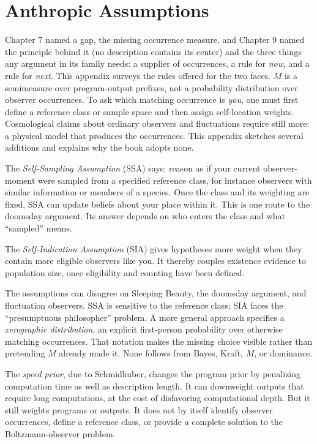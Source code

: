 \chapter{Anthropic Assumptions}\label{app:anthropics}

Chapter 7 named a gap, the missing occurrence measure, and Chapter 9 named the principle behind it (no description contains its center) and the three things any argument in its family needs: a supplier of occurrences, a rule for \emph{now}, and a rule for \emph{next}. This appendix surveys the rules offered for the two faces. $M$ is a semimeasure over program-output prefixes, not a probability distribution over observer occurrences. To ask which matching occurrence is \emph{you}, one must first define a reference class or sample space and then assign self-location weights. Cosmological claims about ordinary observers and fluctuations require still more: a physical model that produces the occurrences. This appendix sketches several additions and explains why the book adopts none.

The \emph{Self-Sampling Assumption} (SSA) says: reason as if your current observer-moment were sampled from a specified reference class, for instance observers with similar information or members of a species. Once the class and its weighting are fixed, SSA can update beliefs about your place within it. This is one route to the doomsday argument. Its answer depends on who enters the class and what ``sampled'' means.

The \emph{Self-Indication Assumption} (SIA) gives hypotheses more weight when they contain more eligible observers like you. It thereby couples existence evidence to population size, once eligibility and counting have been defined.

The assumptions can disagree on Sleeping Beauty, the doomsday argument, and fluctuation observers. SSA is sensitive to the reference class; SIA faces the ``presumptuous philosopher'' problem. A more general approach specifies a \emph{xerographic distribution}, an explicit first-person probability over otherwise matching occurrences. That notation makes the missing choice visible rather than pretending $M$ already made it. None follows from Bayes, Kraft, $M$, or dominance.

The \emph{speed prior}, due to Schmidhuber, changes the program prior by penalizing computation time as well as description length. It can downweight outputs that require long computations, at the cost of disfavoring computational depth. But it still weights programs or outputs. It does not by itself identify observer occurrences, define a reference class, or provide a complete solution to the Boltzmann-observer problem.

